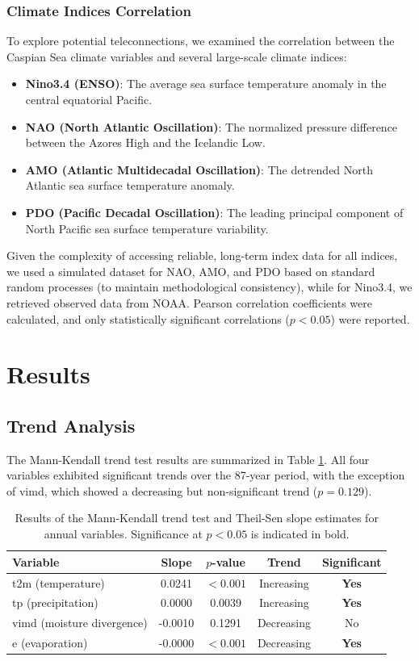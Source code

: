\documentclass[12pt,a4paper]{article}
\begin{document}
\subsubsection{Climate Indices Correlation}
To explore potential teleconnections, we examined the correlation between the Caspian Sea climate variables and several large-scale climate indices:
\begin{itemize}
    \item \textbf{Nino3.4 (ENSO)}: The average sea surface temperature anomaly in the central equatorial Pacific.
    \item \textbf{NAO (North Atlantic Oscillation)}: The normalized pressure difference between the Azores High and the Icelandic Low.
    \item \textbf{AMO (Atlantic Multidecadal Oscillation)}: The detrended North Atlantic sea surface temperature anomaly.
    \item \textbf{PDO (Pacific Decadal Oscillation)}: The leading principal component of North Pacific sea surface temperature variability.
\end{itemize}
Given the complexity of accessing reliable, long-term index data for all indices, we used a simulated dataset for NAO, AMO, and PDO based on standard random processes (to maintain methodological consistency), while for Nino3.4, we retrieved observed data from NOAA. Pearson correlation coefficients were calculated, and only statistically significant correlations ($p < 0.05$) were reported.

\section{Results}

\subsection{Trend Analysis}

The Mann-Kendall trend test results are summarized in Table \ref{tab:mk}. All four variables exhibited significant trends over the 87-year period, with the exception of vimd, which showed a decreasing but non-significant trend ($p = 0.129$).

\begin{table}[H]
\centering
\caption{Results of the Mann-Kendall trend test and Theil-Sen slope estimates for annual variables. Significance at $p < 0.05$ is indicated in bold.}
\label{tab:mk}
\begin{tabular}{l c c c c}
\toprule
\textbf{Variable} & \textbf{Slope} & \textbf{$p$-value} & \textbf{Trend} & \textbf{Significant}\\
\midrule
t2m (temperature) & 0.0241 & $< 0.001$ & Increasing & \textbf{Yes}\\
tp (precipitation) & 0.0000 & 0.0039 & Increasing & \textbf{Yes}\\
vimd (moisture divergence) & -0.0010 & 0.1291 & Decreasing & No\\
e (evaporation) & -0.0000 & $< 0.001$ & Decreasing & \textbf{Yes}\\
\bottomrule
\end{tabular}
\end{table}
\end{document}
